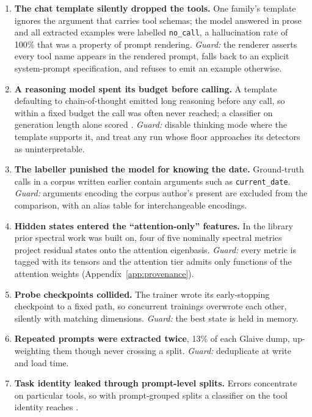 \begin{enumerate}[topsep=2pt,itemsep=2pt,leftmargin=1.4em]
\item \textbf{The chat template silently dropped the tools.} One family's template ignores the argument that
carries tool schemas; the model answered in prose and all \nGemmaDiscardedRecords{} extracted examples were
labelled \texttt{no\_call}, a hallucination rate of 100\% that was a property of prompt rendering.
\emph{Guard:} the renderer asserts every tool name appears in the rendered prompt, falls back to an explicit
system-prompt specification, and refuses to emit an example otherwise.
\item \textbf{A reasoning model spent its budget before calling.} A template defaulting to chain-of-thought
emitted long reasoning before any call, so within a fixed budget the call was often never reached; a
classifier on generation length alone scored \aucLengthConfoundQwenDenseBfclAll{}. \emph{Guard:} disable
thinking mode where the template supports it, and treat any run whose floor approaches its detectors as
uninterpretable.
\item \textbf{The labeller punished the model for knowing the date.} Ground-truth calls in a corpus written
earlier contain arguments such as \texttt{current\_date}. \emph{Guard:} arguments encoding the corpus author's
present are excluded from the comparison, with an alias table for interchangeable encodings.
\item \textbf{Hidden states entered the ``attention-only'' features.} In the library prior spectral work was
built on, four of five nominally spectral metrics project residual states onto the attention eigenbasis.
\emph{Guard:} every metric is tagged with its tensors and the attention tier admits only functions of the
attention weights (Appendix~\ref{app:provenance}).
\item \textbf{Probe checkpoints collided.} The trainer wrote its early-stopping checkpoint to a fixed path,
so concurrent trainings overwrote each other, silently with matching dimensions. \emph{Guard:} the best state
is held in memory.
\item \textbf{Repeated prompts were extracted twice}, 13\% of each Glaive dump, up-weighting them though
never crossing a split. \emph{Guard:} deduplicate at write and load time.
\item \textbf{Task identity leaked through prompt-level splits.} Errors concentrate on particular tools, so
with prompt-grouped splits a classifier on the tool identity reaches \aucToolConfoundLlamaOneBGlaiveAll{}.

\end{enumerate}
